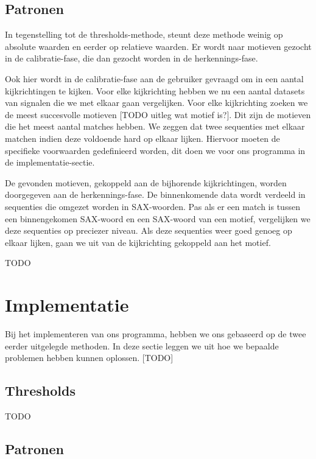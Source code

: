 \documentclass{article}
\begin{document}
\subsection{Patronen}

In tegenstelling tot de thresholds-methode, steunt deze methode weinig op absolute waarden en eerder op relatieve waarden. Er wordt naar motieven gezocht in de calibratie-fase, die dan gezocht worden in de herkennings-fase. \cite{motifs}

Ook hier wordt in de calibratie-fase aan de gebruiker gevraagd om in een aantal kijkrichtingen te kijken. Voor elke kijkrichting hebben we nu een aantal datasets van signalen die we met elkaar gaan vergelijken. Voor elke kijkrichting zoeken we de meest succesvolle motieven [TODO uitleg wat motief is?]. Dit zijn de motieven die het meest aantal matches hebben. We zeggen dat twee sequenties met elkaar matchen indien deze voldoende hard op elkaar lijken. Hiervoor moeten de specifieke voorwaarden gedefinieerd worden, dit doen we voor ons programma in de implementatie-sectie.

De gevonden motieven, gekoppeld aan de bijhorende kijkrichtingen, worden doorgegeven aan de herkennings-fase. De binnenkomende data wordt verdeeld in sequenties die omgezet worden in SAX-woorden. Pas als er een match is tussen een binnengekomen SAX-woord en een SAX-woord van een motief, vergelijken we deze sequenties op preciezer niveau. Als deze sequenties weer goed genoeg op elkaar lijken, gaan we uit van de kijkrichting gekoppeld aan het motief.

TODO

\section{Implementatie}

Bij het implementeren van ons programma, hebben we ons gebaseerd op de twee eerder uitgelegde methoden. In deze sectie leggen we uit hoe we bepaalde problemen hebben kunnen oplossen. [TODO]

\subsection{Thresholds}

TODO

\subsection{Patronen}
\end{document}
